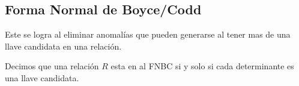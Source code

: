 \documentclass[12pt, fleqn]{report}                             %
\theoremstyle{break}                                            %
\begin{document}
            \clearpage
            \subsection{Forma Normal de Boyce/Codd}

                Este se logra al eliminar anomalías que pueden generarse al tener mas de una
                llave candidata en una relación.

                Decimos que una relación $R$ esta en al FNBC si y solo si
                cada determinante es una llave candidata.

                \vspace{3em}
\end{document}
